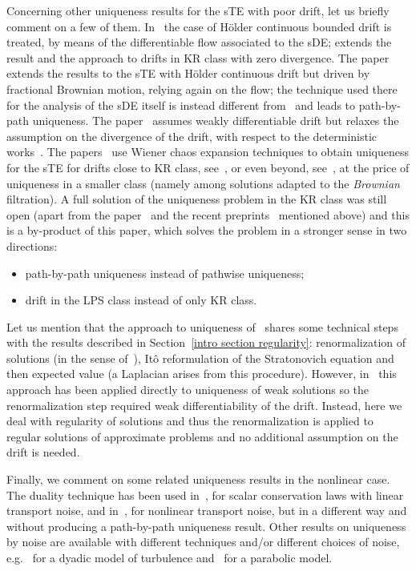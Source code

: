\documentclass[a4paper,10pt]{article}
\newcommand\1{\mathbbm{1}}
\numberwithin{equation}{section}
\begin{document}
Concerning other uniqueness results for the sTE with poor drift, let us briefly comment on a few of them. In~\cite{FLAGUBPRI10} the case of H\"{o}lder continuous bounded drift is treated, by means of the differentiable flow associated to the sDE; \cite{NEVOLI15} extends the result and the approach to drifts in KR class with zero divergence. The paper~\cite{CATELLIER16} extends the results to the sTE with H\"older continuous drift but driven by fractional Brownian motion, relying again on the flow; the technique used there for the analysis of the sDE itself is instead different from~\cite{FLAGUBPRI10} and leads to path-by-path uniqueness. The paper~\cite{ATTFLA11} assumes weakly differentiable drift but relaxes the assumption on the divergence of the drift, with respect to the deterministic works~\cite{DIPELI89,AMBROSIO04}. The papers~\cite{MAU11,FEDNEVOLI18} use Wiener chaos expansion techniques to obtain uniqueness for the sTE for drifts close to KR class, see~\cite{MAU11}, or even beyond, see~\cite{FEDNEVOLI18}, at the price of uniqueness in a smaller class (namely among solutions adapted to the \textit{Brownian} filtration). A full solution of the uniqueness problem in the KR class was still open (apart from the paper~\cite{NEVOLI16} and the recent preprints~\cite{NAM18,WLW17} mentioned above) and this is a by-product of this paper, which solves the problem in a stronger sense in two directions:
\begin{itemize}
\item[i)] path-by-path uniqueness instead of pathwise uniqueness;
\item[ii)] drift in the LPS class instead of only KR class.
\end{itemize}
Let us mention that the approach to uniqueness of~\cite{ATTFLA11} shares some technical steps with the results described in Section~\ref{intro section regularity}: renormalization of solutions (in the sense of~\cite{DIPELI89}), It\^{o} reformulation of the Stratonovich equation and then expected value (a Laplacian arises from this procedure). However, in~\cite{ATTFLA11} this approach has been applied directly to uniqueness of weak solutions so the renormalization step required weak differentiability of the drift. Instead, here we deal with regularity of solutions and thus the renormalization is applied to regular solutions of approximate problems and no additional assumption on the drift is needed.

Finally, we comment on some related uniqueness results in the nonlinear case. The duality technique has been used in~\cite{GESMAU18}, for scalar conservation laws with linear transport noise, and in~\cite{GESSMI19}, for nonlinear transport noise, but in a different way and without producing a path-by-path uniqueness result. Other results on uniqueness by noise are available with different techniques and/or different choices of noise, e.g.~\cite{BIA13} for a dyadic model of turbulence and~\cite{BALGYOPAR94} for a parabolic model.
\end{document}
